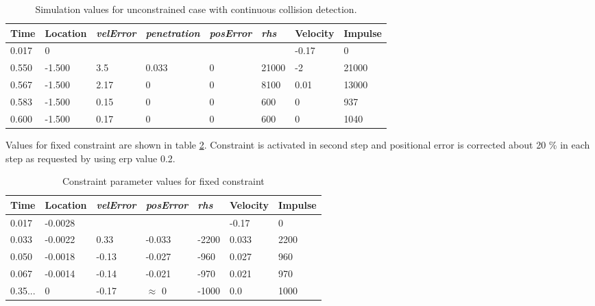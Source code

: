 \begin {table}[htb!]
\begin{center}
\begin{tabular}{|l| l|l| l|l|l|l|l|}
\hline
{\bf Time} & 
{\bf Location} &
{\it velError} & {\it penetration} & {\it posError} & {\it rhs} &
{\bf Velocity} & 
{\bf Impulse} \\  \hline
0.017 &  0 & & & &  &-0.17 & 0 \\  \hline
0.550 &  -1.500 & 3.5 & 0.033 & 0 & 21000& -2 & 21000 \\  \hline
0.567 &  -1.500 & 2.17 & 0 & 0  &  8100 & 0.01 & 13000 \\  \hline
0.583 &  -1.500 & 0.15 & 0 & 0 & 600  & 0 & 937 \\  \hline
0.600 &  -1.500 & 0.17 & 0 & 0 & 600  & 0 & 1040 \\  \hline
\end {tabular}
\end{center}
\caption {Simulation values for unconstrained case with continuous collision detection. } 
\label{tab:freeBlockValuesWithCcd} 
\end {table}

Values for fixed constraint are shown in table
\ref{tab:fixedBlockValues}. Constraint is activated in second step and positional error is corrected
about 20 \% in each step as requested by using erp value 0.2.

\begin {table}[htb!]
\begin{center}
\begin{tabular}{|l|l| l| l|l|l|l|}
\hline
{\bf Time} & 
{\bf Location} &
{\it velError} & {\it posError} & {\it rhs} &
{\bf Velocity} & 
{\bf Impulse} \\  \hline
0.017 & -0.0028 &  & & & -0.17 & 0 \\  \hline
0.033 & -0.0022 & 0.33 & -0.033 & -2200 & 0.033 & 2200 \\  \hline
0.050 & -0.0018 & -0.13 & -0.027 & -960 & 0.027 & 960 \\  \hline
0.067 & -0.0014 &-0.14 & -0.021 & -970 & 0.021 & 970 \\  \hline
0.35... & 0 &-0.17 & $\approx$ 0 & -1000 &0.0 & 1000 \\  \hline
\end {tabular}
\end{center}
\caption {Constraint parameter values for fixed constraint} \label{tab:fixedBlockValues} 
\end {table}

